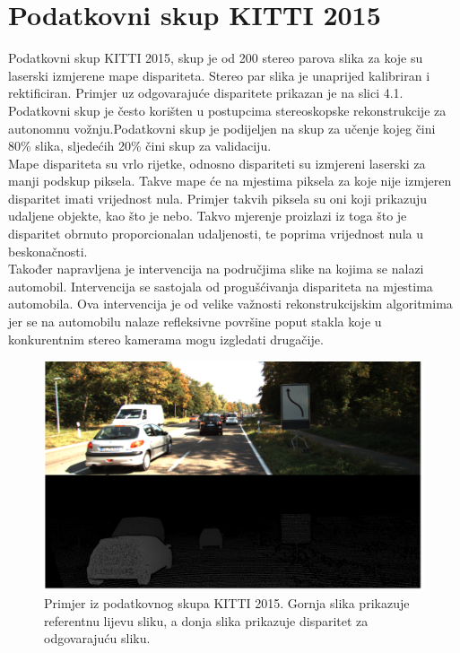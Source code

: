 \documentclass[times, utf8, zavrsni, numeric]{fer}
\begin{document}
\section{Podatkovni skup KITTI 2015}
Podatkovni skup KITTI 2015, skup je od 200 stereo parova slika za koje su laserski izmjerene mape dispariteta. Stereo par slika je unaprijed kalibriran i rektificiran. Primjer uz odgovarajuće disparitete prikazan je na slici 4.1. Podatkovni skup je često korišten u postupcima stereoskopske rekonstrukcije za autonomnu vožnju.Podatkovni skup je podijeljen na skup za učenje kojeg čini 80\% slika, sljedećih 20\% čini skup za validaciju.\\
Mape dispariteta su vrlo rijetke, odnosno dispariteti su izmjereni laserski za manji podskup piksela. Takve mape će na mjestima piksela za koje nije izmjeren disparitet imati vrijednost nula. Primjer takvih piksela su oni koji prikazuju udaljene objekte, kao što je nebo. Takvo mjerenje proizlazi iz toga što je disparitet obrnuto proporcionalan udaljenosti, te poprima vrijednost nula u beskonačnosti. \\
Također napravljena je intervencija na područjima slike na kojima se nalazi automobil. Intervencija se sastojala od progušćivanja dispariteta na mjestima automobila. Ova intervencija je od velike važnosti rekonstrukcijskim algoritmima jer se na automobilu nalaze refleksivne površine poput stakla koje u konkurentnim stereo kamerama mogu izgledati drugačije.\cite{zbontar}
\begin{figure}[htb]
\centering
\includegraphics[width = 14.5cm]{img/slika11.png}
\caption{Primjer iz podatkovnog skupa KITTI 2015. Gornja slika prikazuje referentnu lijevu sliku, a donja slika prikazuje disparitet za odgovarajuću sliku.}
\label{fig:KITTI}
\end{figure}
\end{document}
